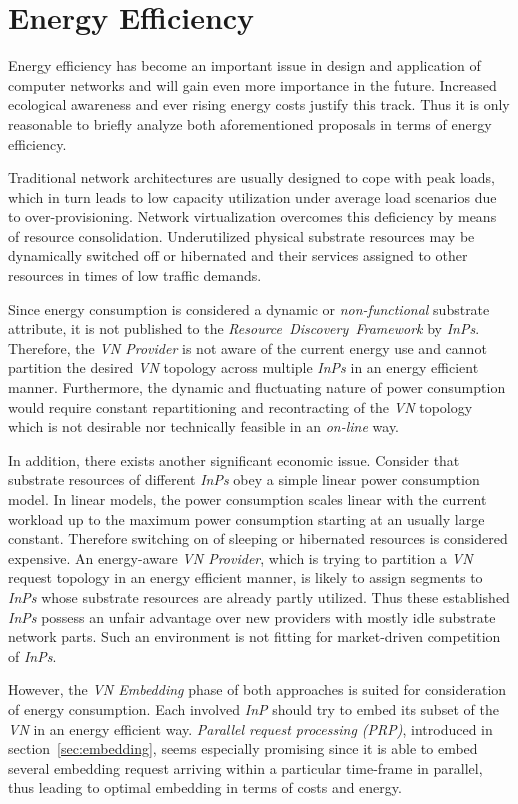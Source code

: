 \documentclass[prodmode,acmtomccap]{acmlarge}
\begin{document}
\section{Energy Efficiency}
\label{sec:efficiency}
Energy efficiency has become an important issue in design and application of computer networks and will gain even more importance in the future. 
Increased ecological awareness and ever rising energy costs justify this track.
Thus it is only reasonable to briefly analyze both aforementioned proposals in terms of energy efficiency.
 
Traditional network architectures are usually designed to cope with peak loads, which in turn leads to low capacity utilization under average load scenarios due to over-provisioning.
Network virtualization overcomes this deficiency by means of resource consolidation. Underutilized physical substrate resources may be dynamically switched off or hibernated and their services
assigned to other resources in times of low traffic demands.

Since energy consumption is considered a dynamic or \emph{non-functional} substrate attribute, it is not published to the \emph{Resource~Discovery~Framework}
by \emph{InPs}. Therefore, the \emph{VN Provider} is not aware of the current energy use and cannot partition the desired \emph{VN} topology across multiple
\emph{InPs} in an energy efficient manner. Furthermore, the dynamic and fluctuating nature of power consumption would require constant repartitioning and recontracting
of the \emph{VN} topology which is not desirable nor technically feasible in an \emph{on-line} way.

In addition, there exists another significant economic issue.
Consider that substrate resources of different \emph{InPs} obey a simple linear power consumption model. In linear models, the power consumption scales linear with the current workload up
to the maximum power consumption starting at an usually large constant. Therefore switching on of sleeping or hibernated resources is considered expensive.
An energy-aware \emph{VN Provider}, which is trying to partition a \emph{VN} request topology in an energy efficient manner, is likely
to assign segments to \emph{InPs} whose substrate resources are already partly utilized. Thus these established \emph{InPs} possess an unfair advantage over new 
providers with mostly idle substrate network parts. Such an environment is not fitting for market-driven competition of \emph{InPs}.

However, the \emph{VN Embedding} phase of both approaches is suited for consideration of energy consumption. Each involved \emph{InP} should try to embed
its subset of the \emph{VN} in an energy efficient way. \emph{Parallel request processing (PRP)}, introduced in section~\ref{sec:embedding}, seems especially
promising since it is able to embed several embedding request arriving within a particular time-frame in parallel, thus leading to optimal embedding in terms of costs and energy.
 
\end{document}
